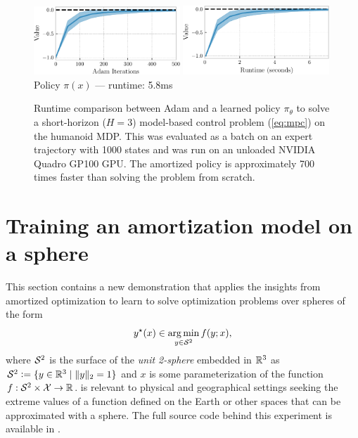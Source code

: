 \begin{figure}[t]
  \centering
  \includegraphics[width=0.49\textwidth]{fig/control-model-based-iter.pdf}
  \hfill
  \includegraphics[width=0.49\textwidth]{fig/control-model-based-time.pdf} \\[5mm]
   Policy $\pi(x)$ --- runtime: 5.8ms
  \caption{Runtime comparison between Adam and a learned policy $\pi_\theta$
    to solve a short-horizon ($H=3$) model-based control
    problem (\cref{eq:mpc}) on the humanoid MDP.
    This was evaluated as a batch on an expert trajectory with
    1000 states and was run on an unloaded NVIDIA Quadro GP100 GPU.
    The amortized policy is approximately
    700 times faster than solving the
    problem from scratch.
  }
  \label{fig:model-based-performance}
\end{figure}

\section{Training an amortization model on a sphere}
\label{sec:impl:sphere}

This section contains a new demonstration that applies
the insights from amortized optimization to learn to solve
optimization problems over spheres of the form
\begin{equation}
  y^\star(x) \in \operatorname*{arg\,min}_{y\in{\mathcal{S}}^2} f(y; x),
  \label{eq:sphere-opt-con}
\end{equation}
where ${\mathcal{S}}^2$ is the surface of the \emph{unit 2-sphere}
embedded in $\mathbb{R}^3$ as ${\mathcal{S}}^2\vcentcolon= \{y\in\mathbb{R}^3 \mid \|y\|_2=1\}$
and $x$ is some parameterization of the function
$f: {\mathcal{S}}^2\times{\mathcal{X}}\rightarrow \mathbb{R}$.
 is relevant to physical and
geographical settings seeking the extreme values of a
function defined on the Earth or other spaces that can
be approximated with a sphere.
The full source code behind this experiment is available
in .

